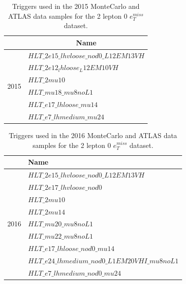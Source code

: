 \begin{table}[]
    \centering
    \caption[2015 triggers table]{Triggers used in the 2015 MonteCarlo and ATLAS data samples for the 2 lepton 0 $e_T^{miss}$ dataset.}
    \label{tab:triggers2015}
    \begin{tabular}{|l|l|}
    \hline
                          & \multicolumn{1}{c|}{Name}              \\ \hline
    \multirow{6}{*}{2015} & $HLT\_2e15\_lhvloose\_nod0\_L12EM13VH$ \\ \cline{2-2} 
                          & $HLT\_2e12_lhloose_L12EM10VH$          \\ \cline{2-2} 
                          & $HLT\_2mu10$                           \\ \cline{2-2} 
                          & $HLT\_mu18\_mu8noL1$                   \\ \cline{2-2} 
                          & $HLT\_e17\_lhloose\_mu14$              \\ \cline{2-2} 
                          & $HLT\_e7\_lhmedium\_mu24$              \\ \hline
    \end{tabular}
    \end{table}



\begin{table}[H]
    \centering
    \caption[2016 triggers table]{Triggers used in the 2016 MonteCarlo and ATLAS data samples for the 2 lepton 0 $e_T^{miss}$ dataset.}
    \label{tab:triggers2016}
    \begin{tabular}{|l|l|}
    \hline
                          & Name  \\ \hline
    \multirow{9}{*}{2016} & $HLT\_2e15\_lhvloose\_nod0\_L12EM13VH$                 \\ \cline{2-2} 
                          & $HLT\_2e17\_lhvloose\_nod0$                   \\ \cline{2-2} 
                          & $HLT\_2mu10$                  \\ \cline{2-2} 
                          & $HLT\_2mu14$                  \\ \cline{2-2} 
                          & $HLT\_mu20\_mu8noL1$                  \\ \cline{2-2} 
                          & $HLT\_mu22\_mu8noL1$                 \\ \cline{2-2} 
                          & $HLT\_e17\_lhloose\_nod0\_mu14$                   \\ \cline{2-2} 
                          & $HLT\_e24\_lhmedium\_nod0\_L1EM20VHI\_mu8noL1$                  \\ \cline{2-2} 
                          & $HLT\_e7\_lhmedium\_nod0\_mu24$                   \\ \hline
    \end{tabular}
    \end{table}




